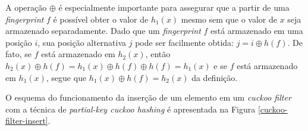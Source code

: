 \documentclass[12pt,twoside,english,brazilian]{article}
\begin{document}
A operação $\oplus$ é especialmente importante para assegurar que a partir de uma \textit{fingerprint} $f$ é possível obter o valor de $h_1(x)$ mesmo sem que o valor de $x$ seja armazenado separadamente. Dado que um \textit{fingerprint} $f$ está armazenado em uma posição $i$, sua posição alternativa $j$ pode ser facilmente obtida: $j = i \oplus h(f)$. De fato, se $f$ está armazenado em $h_2(x)$, então $h_2(x) \oplus h(f) = h_1(x) \oplus h(f) \oplus h(f) = h_1(x)$ e se $f$ está armazenado em $h_1(x)$, segue que $h_1(x) \oplus h(f) = h_2(x)$ da definição.

O esquema do funcionamento da inserção de um elemento em um \textit{cuckoo filter} com a técnica de \textit{partial-key cuckoo hashing} é apresentada na Figura \ref{cuckoo-filter-insert}.

\begin{figure}
    \begin{center}
\end{center}
\end{figure}
\end{document}
